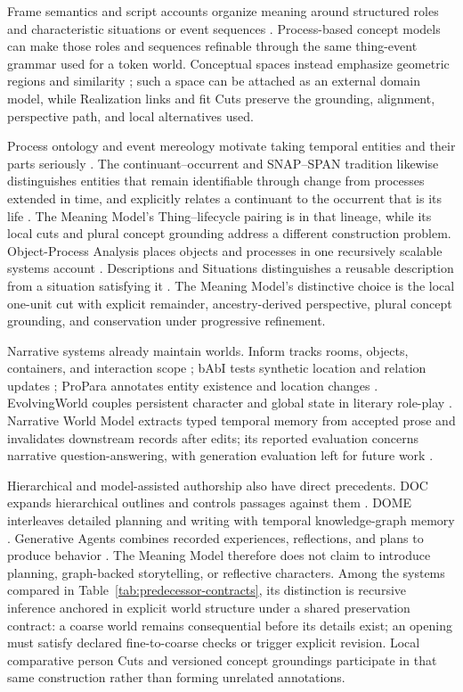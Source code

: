\documentclass[11pt,a4paper]{article}
\begin{document}
Frame semantics and script accounts organize meaning around structured roles
and characteristic situations or event sequences
\cite{fillmore1976frame,schankAbelson1977scripts}. Process-based concept models can
make those roles and sequences refinable through the same thing-event grammar
used for a token world. Conceptual spaces instead emphasize geometric regions
and similarity \cite{gardenfors2000conceptualSpaces}; such a space can be
attached as an external domain model, while Realization links and fit Cuts
preserve the grounding, alignment, perspective path, and local alternatives
used.

Process ontology and event mereology motivate taking temporal entities and
their parts seriously \cite{whitehead1978process,savellos2000events}.
The continuant--occurrent and SNAP--SPAN tradition likewise distinguishes
entities that remain identifiable through change from processes extended in
time, and explicitly relates a continuant to the occurrent that is its life
\cite{grenonSmith2004snapspan}. The Meaning Model's Thing--lifecycle pairing is
in that lineage, while its local cuts and plural concept grounding address a
different construction problem.
Object-Process Analysis places objects and processes in one recursively scalable
systems account \cite{dori1995opa}. Descriptions and Situations distinguishes a
reusable description from a situation satisfying it
\cite{gangemiMika2003dns}. The Meaning Model's distinctive choice is the local
one-unit cut with explicit remainder, ancestry-derived perspective, plural concept
grounding, and conservation under progressive refinement.

Narrative systems already maintain worlds. Inform tracks rooms, objects,
containers, and interaction scope \cite{nelson2001inform}; bAbI tests synthetic
location and relation updates \cite{weston2015babi}; ProPara annotates entity
existence and location changes \cite{dalvi2018propara}. EvolvingWorld couples
persistent character and global state in literary role-play
\cite{zong2026evolvingworld}. Narrative World Model extracts typed temporal memory
from accepted prose and invalidates downstream records after edits; its reported
evaluation concerns narrative question-answering, with generation evaluation
left for future work \cite{saifullah2026narrativeworld}.

Hierarchical and model-assisted authorship also have direct precedents. DOC
expands hierarchical outlines and controls passages against them
\cite{yang2023doc}. DOME interleaves detailed planning and writing with temporal
knowledge-graph memory \cite{wang2024dome}. Generative Agents combines recorded
experiences, reflections, and plans to produce behavior \cite{park2023agents}.
The Meaning Model therefore does not claim to introduce planning, graph-backed
storytelling, or reflective characters. Among the systems compared in
Table~\ref{tab:predecessor-contracts}, its distinction is recursive
inference anchored in explicit world structure under a shared preservation
contract: a coarse world remains consequential before
its details exist; an opening must satisfy declared fine-to-coarse checks or
trigger explicit revision. Local comparative person Cuts and versioned concept
groundings participate in that same construction rather than forming unrelated
annotations.
\end{document}
